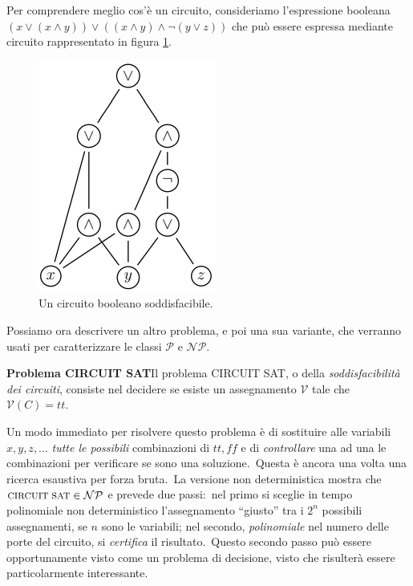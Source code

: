 \noindent Per comprendere meglio cos'è un circuito, consideriamo l'espressione booleana $(x \lor (x \land y)) \lor ((x \land y) \land \neg(y \lor z))$ che può essere espressa mediante circuito rappresentato in figura \ref{fig:circ}.

\begin{figure}[H]
    \centering
    \includegraphics[scale=0.6]{images/Circuito.PNG}
    \caption{Un circuito booleano soddisfacibile.}
    \label{fig:circ}
\end{figure}

\noindent Possiamo ora descrivere un altro problema, e poi una sua variante, che verranno usati per caratterizzare le classi $\mathcal{P}$ e $\mathcal{NP}$.

\vspace{12pt}
\noindent\textbf{Problema CIRCUIT SAT}\quad Il problema {\footnotesize CIRCUIT SAT}, o della \textit{soddisfacibilità dei circuiti}, consiste nel decidere se esiste un assegnamento $\mathcal{V}$ tale che $\mathcal{V}(C)=\mathit{tt}$.\

\medskip
\noindent Un modo immediato per risolvere questo problema è di sostituire alle variabili $x, y, z,\dots$ \textit{tutte le possibili} combinazioni di $\mathit{tt}, \mathit{ff}$ e di \textit{controllare} una ad una le combinazioni per verificare se sono una soluzione.\
Questa è ancora una volta una ricerca esaustiva per forza bruta.\
La versione non deterministica mostra che $\mbox{\footnotesize CIRCUIT SAT} \in \mathcal{NP}$ e prevede due passi:\ nel primo si sceglie in tempo polinomiale non deterministico l'assegnamento ``giusto'' tra i $2^n$ possibili assegnamenti, se $n$ sono le variabili; nel secondo, \textit{polinomiale} nel numero delle porte del circuito, si \textit{certifica} il risultato.\
Questo secondo passo può essere opportunamente visto come un problema di decisione, visto che risulterà essere particolarmente interessante.\

